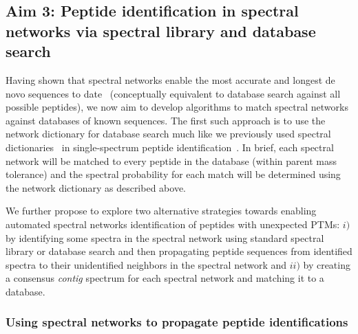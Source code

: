 \documentclass[arial,11pt]{article}
\begin{document}

\subsection{Aim 3: Peptide identification in spectral networks via spectral library and database search}

Having shown that spectral networks enable the most accurate and longest de novo sequences to date~\cite{guthals12metasps} (conceptually equivalent to database search against all possible peptides), we now aim to develop algorithms to match spectral networks against databases of known sequences. The first such approach is to use the network dictionary for database search much like we previously used spectral dictionaries~\cite{kim09msdict} in single-spectrum peptide identification~\cite{kim10cidetd,jeong11}. In brief, each spectral network will be matched to every peptide in the database (within parent mass tolerance) and the spectral probability for each match will be determined using the network dictionary as described above.

We further propose to explore two alternative strategies towards enabling automated spectral networks identification of peptides with unexpected PTMs: $i)$ by identifying some spectra in the spectral network using standard spectral library or database search and then propagating peptide sequences from identified spectra to their unidentified neighbors in the spectral network and $ii)$ by creating a consensus {\em contig} spectrum for each spectral network and matching it to a database. %

\subsubsection{Using spectral networks to propagate peptide identifications}\label{trd.snets.aim.id.DBsearch}
\end{document}
